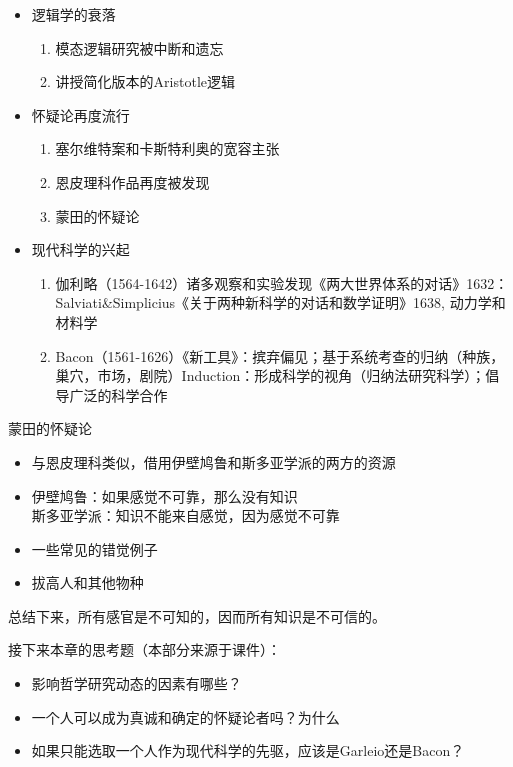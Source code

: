 \documentclass{ctexart}
\begin{document}
\begin{itemize}
    \item 逻辑学的衰落
    \begin{enumerate}
        \item 模态逻辑研究被中断和遗忘
        \item 讲授简化版本的Aristotle逻辑
    \end{enumerate}
    \item 怀疑论再度流行
    \begin{enumerate}
        \item 塞尔维特案和卡斯特利奥的宽容主张
        \item 恩皮理科作品再度被发现
        \item 蒙田的怀疑论
    \end{enumerate}
    \item 现代科学的兴起
    \begin{enumerate}
        \item 伽利略（1564-1642）诸多观察和实验发现《两大世界体系的对话》1632：Salviati\&Simplicius《关于两种新科学的对话和数学证明》1638, 动力学和材料学
        \item Bacon（1561-1626）《新工具》：摈弃偏见；基于系统考查的归纳（种族，巢穴，市场，剧院）Induction：形成科学的视角（归纳法研究科学）；倡导广泛的科学合作
    \end{enumerate}
\end{itemize}

\begin{fancybox}{蒙田的怀疑论}
\begin{itemize}
    \item 与恩皮理科类似，借用伊壁鸠鲁和斯多亚学派的两方的资源
    \item 伊壁鸠鲁：如果感觉不可靠，那么没有知识\\斯多亚学派：知识不能来自感觉，因为感觉不可靠
    \item 一些常见的错觉例子
    \item 拔高人和其他物种
\end{itemize}
总结下来，所有感官是不可知的，因而所有知识是不可信的。
\end{fancybox}

接下来本章的思考题（本部分来源于课件）：

\begin{itemize}
    \item 影响哲学研究动态的因素有哪些？
    \item 一个人可以成为真诚和确定的怀疑论者吗？为什么
    \item 如果只能选取一个人作为现代科学的先驱，应该是Garleio还是Bacon？
\end{itemize}
\end{document}
